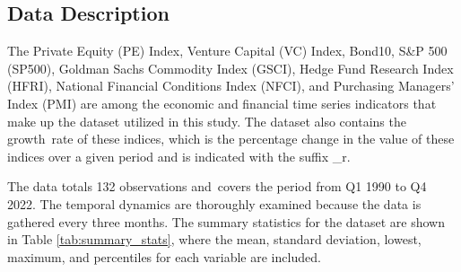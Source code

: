 \documentclass[12pt]{article}
\begin{document}
\subsection{Data Description}
The Private Equity (PE) Index, Venture Capital (VC) Index, Bond10, S\&P 500 (SP500), Goldman Sachs Commodity Index (GSCI), Hedge Fund Research Index (HFRI), National Financial Conditions Index (NFCI), and Purchasing Managers' Index (PMI) are among the economic and financial time series indicators that make up the dataset utilized in this study. The dataset also contains the growth rate of these indices, which is the percentage change in the value of these indices over a given period and is indicated with the suffix \_r.

The data totals 132 observations and covers the period from Q1 1990 to Q4 2022. The temporal dynamics are thoroughly examined because the data is gathered every three months. The summary statistics for the dataset are shown in Table \ref{tab:summary_stats}, where the mean, standard deviation, lowest, maximum, and percentiles for each variable are included.
\end{document}
